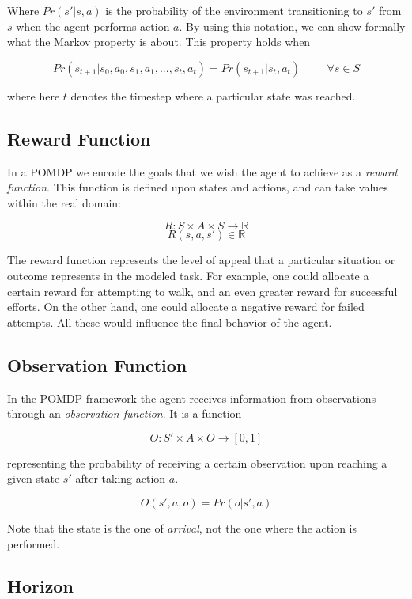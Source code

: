 Where $Pr(s'|s,a)$ is the probability of the environment transitioning to $s'$ from $s$ when the
agent performs action $a$. By using this notation, we can show formally what the Markov property is
about. This property holds when

\[ Pr(s_{t+1} | s_{0}, a_{0}, s_{1}, a_{1}, ..., s_{t}, a_{t} ) = Pr(s_{t+1} | s_t, a_t ) \hspace{1cm} \forall s \in S \]

where here $t$ denotes the timestep where a particular state was reached.

\subsection{Reward Function}

In a POMDP we encode the goals that we wish the agent to achieve as a \textit{reward function}.
This function is defined upon states and actions, and can take values within the real domain:

\[ R: S\times A\times S \rightarrow \mathbb{R} \]
\[ R(s, a, s') \in \mathbb{R} \]

The reward function represents the level of appeal that a particular situation or outcome represents
in the modeled task. For example, one could allocate a certain reward for attempting to walk, and an
even greater reward for successful efforts. On the other hand, one could allocate a negative reward
for failed attempts. All these would influence the final behavior of the agent.

\subsection{Observation Function}

In the POMDP framework the agent receives information from observations through an
\textit{observation function}. It is a function

\[ O : S' \times A \times O \rightarrow [0,1] \]

representing the probability of receiving a certain observation upon reaching a given state $s'$
after taking action $a$.

\[ O(s', a, o) = Pr(o | s', a) \]

Note that the state is the one of \textit{arrival}, not the one where the action is performed.

\subsection{Horizon}

